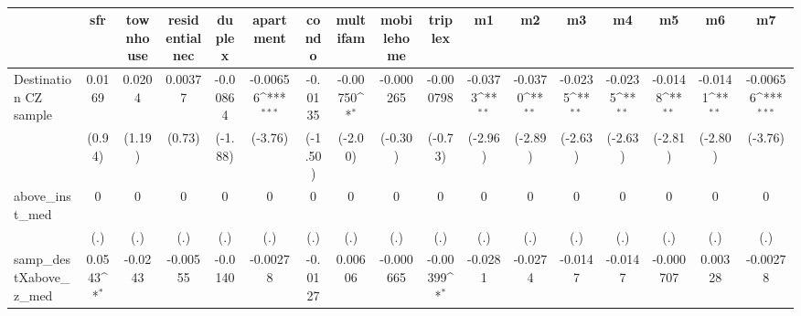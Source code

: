 \begin{table}[htbp]\centering
\def\sym#1{\ifmmode^{#1}\else\(^{#1}\)\fi}
\caption{ \label{tab1}}
\begin{tabular}{l*{16}{c}}
\toprule
                    &\multicolumn{1}{c}{sfr}&\multicolumn{1}{c}{townhouse}&\multicolumn{1}{c}{residentialnec}&\multicolumn{1}{c}{duplex}&\multicolumn{1}{c}{apartment}&\multicolumn{1}{c}{condo}&\multicolumn{1}{c}{multifam}&\multicolumn{1}{c}{mobilehome}&\multicolumn{1}{c}{triplex}&\multicolumn{1}{c}{m1}&\multicolumn{1}{c}{m2}&\multicolumn{1}{c}{m3}&\multicolumn{1}{c}{m4}&\multicolumn{1}{c}{m5}&\multicolumn{1}{c}{m6}&\multicolumn{1}{c}{m7}\\
\midrule
Destination CZ sample&      0.0169         &      0.0204         &     0.00377         &    -0.00864         &    -0.00656\sym{***}&     -0.0135         &    -0.00750\sym{*}  &   -0.000265         &   -0.000798         &     -0.0373\sym{**} &     -0.0370\sym{**} &     -0.0235\sym{**} &     -0.0235\sym{**} &     -0.0148\sym{**} &     -0.0141\sym{**} &    -0.00656\sym{***}\\
                    &      (0.94)         &      (1.19)         &      (0.73)         &     (-1.88)         &     (-3.76)         &     (-1.50)         &     (-2.00)         &     (-0.30)         &     (-0.73)         &     (-2.96)         &     (-2.89)         &     (-2.63)         &     (-2.63)         &     (-2.81)         &     (-2.80)         &     (-3.76)         \\
\addlinespace
above\_inst\_med      &           0         &           0         &           0         &           0         &           0         &           0         &           0         &           0         &           0         &           0         &           0         &           0         &           0         &           0         &           0         &           0         \\
                    &         (.)         &         (.)         &         (.)         &         (.)         &         (.)         &         (.)         &         (.)         &         (.)         &         (.)         &         (.)         &         (.)         &         (.)         &         (.)         &         (.)         &         (.)         &         (.)         \\
\addlinespace
samp\_destXabove\_z\_med&      0.0543\sym{*}  &     -0.0243         &    -0.00555         &     -0.0140         &    -0.00278         &     -0.0127         &     0.00606         &   -0.000665         &    -0.00399\sym{*}  &     -0.0281         &     -0.0274         &     -0.0147         &     -0.0147         &   -0.000707         &     0.00328         &    -0.00278         \\

\end{tabular}
\end{table}
